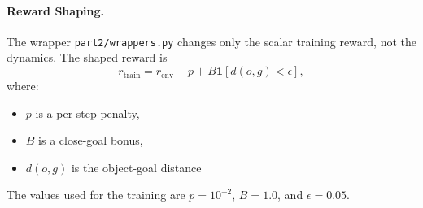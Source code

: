 \begin{table}[H]
\centering
\small
{}
\caption{Main hyperparameters used for the Part 2 Stable-Baselines3 training runs. Dashes indicate algorithm-specific parameters that are not used.
Bold values indicate the final parameters selected for the evaluation models.
}
\label{tab:training-hyperparameters}
\end{table}

\paragraph{Reward Shaping.}

The wrapper \texttt{part2/wrappers.py} changes only the scalar training reward, not the dynamics. The shaped reward is
\begin{equation}
r_{\mathrm{train}} = r_{\mathrm{env}} - p + B \mathbf{1}[d(o,g)<\epsilon],
\end{equation}
where:
\begin{itemize}
    \item $p$ is a per-step penalty,
    \item $B$ is a close-goal bonus,
    \item $d(o,g)$ is the object-goal distance
\end{itemize}  
The values used for the training are $p=10^{-2}$, $B=1.0$, and $\epsilon=0.05$. 

